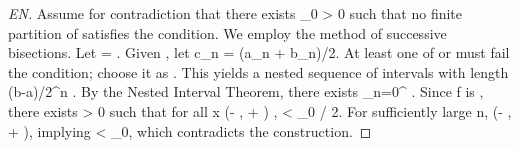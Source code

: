 \begin{proof}[EN]
Assume for contradiction that there exists \varepsilon_0 > 0 such that no finite partition of  satisfies the condition. We employ the method of successive bisections. Let  = . Given , let c_n = (a_n + b_n)/2. At least one of  or  must fail the condition; choose it as . This yields a nested sequence of intervals with length (b-a)/2^n . By the Nested Interval Theorem, there exists \alpha \in \bigcap_{n=0}^{\infty} . Since f is , there exists \delta > 0 such that for all x \in (\alpha - \delta, \alpha + \delta) \cap {},  < \varepsilon_0 / 2. For sufficiently large n,  \subset (\alpha - \delta, \alpha + \delta), implying  < \varepsilon_0, which contradicts the construction.
\end{proof}